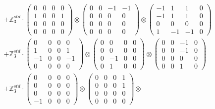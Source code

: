 \documentclass{article}
\begin{document}
{\begin{align}
        &+ \label{Rs16-Rc11-Solution-26-c22} \mathbb{Z}_3^{std} \cdot 
            \begin{pmatrix} 0 & 0 & 0 & 0 \\ 1 & 0 & 0 & 1 \\ 0 & 0 & 0 & 0 \\ 0 & 0 & 0 & 0 \end{pmatrix} \otimes 
            \begin{pmatrix} 0 & 0 & -1 & -1 \\ 0 & 0 & 0 & 0 \\ 0 & 0 & 0 & 0 \\ 0 & 0 & 0 & 0 \end{pmatrix} \otimes 
            \begin{pmatrix} -1 & 1 & 1 & 0 \\ -1 & 1 & 1 & 0 \\ 0 & 0 & 0 & 0 \\ 1 & -1 & -1 & 0 \end{pmatrix} \\ 
        &+ \label{Rs16-Rc11-Solution-26-c23} \mathbb{Z}_3^{std} \cdot 
            \begin{pmatrix} 0 & 0 & 0 & 0 \\ 1 & 0 & 0 & 1 \\ -1 & 0 & 0 & -1 \\ 0 & 0 & 0 & 0 \end{pmatrix} \otimes 
            \begin{pmatrix} 0 & 0 & 0 & 0 \\ 0 & 0 & 0 & 0 \\ 0 & -1 & 0 & 0 \\ 0 & 1 & 0 & 0 \end{pmatrix} \otimes 
            \begin{pmatrix} 0 & 0 & -1 & 0 \\ 0 & 0 & -1 & 0 \\ 0 & 0 & 0 & 0 \\ 0 & 0 & 1 & 0 \end{pmatrix} \\ 
        &+ \label{Rs16-Rc11-Solution-26-c24} \mathbb{Z}_3^{std} \cdot 
            \begin{pmatrix} 0 & 0 & 0 & 0 \\ 0 & 0 & 0 & 0 \\ 0 & 0 & 0 & 0 \\ -1 & 0 & 0 & 0 \end{pmatrix} \otimes 
            \begin{pmatrix} 0 & 0 & 0 & 1 \\ 0 & 0 & 0 & 1 \\ 0 & 0 & 0 & 0 \\ 0 & 0 & 0 & 0 \end{pmatrix} \otimes 

\end{align}}
\end{document}
